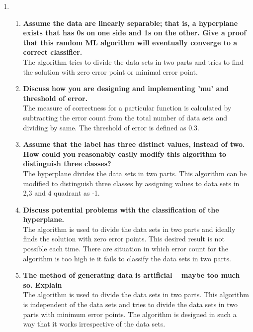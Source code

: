 \documentclass{article}
\begin{document}
\begin{enumerate}
\pagebreak[4]


\item 
\begin{enumerate}

\item {\bf Assume the data are linearly separable; that is, a hyperplane exists that has 0s on one side and 1s on the other. Give a proof that this random ML algorithm 
will eventually converge to a correct classifier. }\\
                The algorithm tries to divide the data sets in two parts and tries to find the solution with zero error point or minimal error point.\\ 

\item {\bf Discuss how you are designing and implementing 'mu' and threshold of error. }\\
                The measure of correctness for a particular function is calculated by subtracting the error count from the total number of data sets and dividing by same. The threshold of error is defined as 0.3.\\

\item {\bf Assume that the label has three distinct values, instead of two. How could you reasonably easily modify this algorithm to distinguish three classes?}\\
                The hyperplane divides the data sets in two parts. This algorithm can be modified to distinguish three classes by assigning values to data sets in 2,3 and 4 quadrant as -1.\\ 

\item {\bf Discuss potential problems with the classification of the hyperplane.}\\
                The algorithm is used to divide the data sets in two parts and ideally finds the solution with zero error points. This desired result is not possible each time. There are situation in which error count for the algorithm is too high ie it fails to classify the data sets in two parts.   \\

\item {\bf The method of generating data is artificial – maybe too much so. Explain }\\
                 The algorithm is used to divide the data sets in two parts. This algorithm is independent of the data sets and tries to divide the data sets in two parts with minimum error points. The algorithm is designed in such a way that it works irrespective of the data sets.\\


\end{enumerate}
\end{enumerate}
\end{document}
